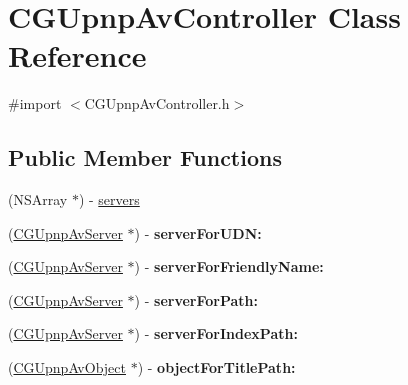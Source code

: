 \hypertarget{interface_c_g_upnp_av_controller}{\section{C\-G\-Upnp\-Av\-Controller Class Reference}
\label{interface_c_g_upnp_av_controller}
}


{\ttfamily \#import $<$C\-G\-Upnp\-Av\-Controller.\-h$>$}

\subsection*{Public Member Functions}
\begin{DoxyCompactItemize}
\item 
(N\-S\-Array $\ast$) -\/ \hyperlink{interface_c_g_upnp_av_controller_a0a95ffa139d9f2f2ee91a451ac33b24d}{servers}
\item 
\hypertarget{interface_c_g_upnp_av_controller_a932bd6cb8322430556e9cfa8be81116f}{(\hyperlink{interface_c_g_upnp_av_server}{C\-G\-Upnp\-Av\-Server} $\ast$) -\/ {\bfseries server\-For\-U\-D\-N\-:}}\label{interface_c_g_upnp_av_controller_a932bd6cb8322430556e9cfa8be81116f}

\item 
\hypertarget{interface_c_g_upnp_av_controller_abcf53e9e8fd4d4bc65e04e83733efe4a}{(\hyperlink{interface_c_g_upnp_av_server}{C\-G\-Upnp\-Av\-Server} $\ast$) -\/ {\bfseries server\-For\-Friendly\-Name\-:}}\label{interface_c_g_upnp_av_controller_abcf53e9e8fd4d4bc65e04e83733efe4a}

\item 
\hypertarget{interface_c_g_upnp_av_controller_a3067311d98457097211549c179751ffb}{(\hyperlink{interface_c_g_upnp_av_server}{C\-G\-Upnp\-Av\-Server} $\ast$) -\/ {\bfseries server\-For\-Path\-:}}\label{interface_c_g_upnp_av_controller_a3067311d98457097211549c179751ffb}

\item 
\hypertarget{interface_c_g_upnp_av_controller_a4b83f67aff5ce6ab653d5194cebbbd1f}{(\hyperlink{interface_c_g_upnp_av_server}{C\-G\-Upnp\-Av\-Server} $\ast$) -\/ {\bfseries server\-For\-Index\-Path\-:}}\label{interface_c_g_upnp_av_controller_a4b83f67aff5ce6ab653d5194cebbbd1f}

\item 
\hypertarget{interface_c_g_upnp_av_controller_a87f566a70a91beb2f19d50812af28c6e}{(\hyperlink{interface_c_g_upnp_av_object}{C\-G\-Upnp\-Av\-Object} $\ast$) -\/ {\bfseries object\-For\-Title\-Path\-:}}\label{interface_c_g_upnp_av_controller_a87f566a70a91beb2f19d50812af28c6e}


\end{DoxyCompactItemize}
